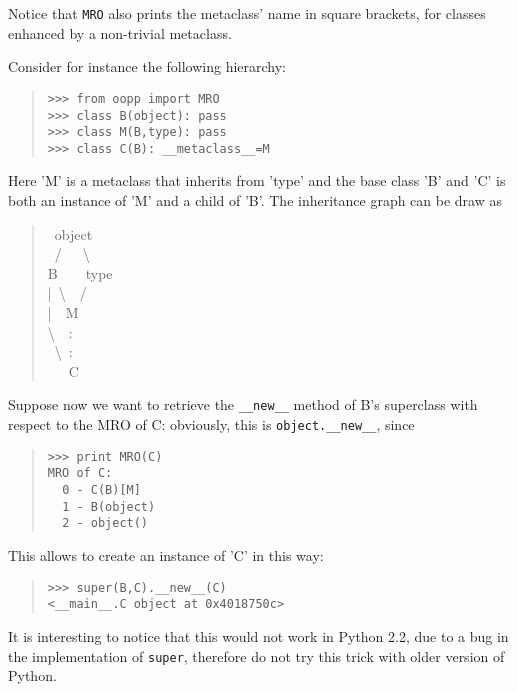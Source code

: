 \documentclass[10pt,english]{article}
\begin{document}
Notice that \texttt{MRO} also prints the metaclass' name in square brackets, for
classes enhanced by a non-trivial metaclass.

Consider for instance the following hierarchy:
\begin{quote}
\begin{verbatim}>>> from oopp import MRO
>>> class B(object): pass
>>> class M(B,type): pass
>>> class C(B): __metaclass__=M\end{verbatim}
\end{quote}

Here 'M' is a metaclass that inherits from 'type' and the base class 'B'
and 'C' is both an instance of 'M' and a child of 'B'. The inheritance
graph can be draw as
\begin{quote}
\begin{ttfamily}\begin{flushleft}
\mbox{~object}\\
\mbox{~/~~~{\textbackslash}}\\
\mbox{B~~~~type}\\
\mbox{|~{\textbackslash}~~/}\\
\mbox{|~~M}\\
\mbox{{\textbackslash}~~:}\\
\mbox{~{\textbackslash}~:~~~~~}\\
\mbox{~~~C}
\end{flushleft}\end{ttfamily}
\end{quote}

Suppose now we want to retrieve the \texttt{{\_}{\_}new{\_}{\_}} method of B's superclass
with respect to the MRO of C: obviously, this is \texttt{object.{\_}{\_}new{\_}{\_}}, since
\begin{quote}
\begin{verbatim}>>> print MRO(C)
MRO of C:
  0 - C(B)[M]
  1 - B(object)
  2 - object()\end{verbatim}
\end{quote}

This allows to create an instance of 'C' in this way:
\begin{quote}
\begin{verbatim}>>> super(B,C).__new__(C) 
<__main__.C object at 0x4018750c>\end{verbatim}
\end{quote}

It is interesting to notice that this would not work in Python 2.2,
due to a bug in the implementation of \texttt{super}, therefore do not
try this trick with older version of Python.
\end{document}
